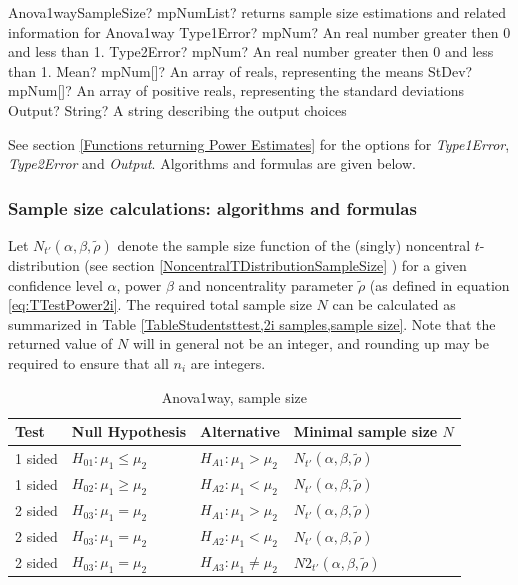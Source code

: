 \begin{mpFunctionsExtract}
	\mpFunctionFiveNotImplemented
	{Anova1waySampleSize? mpNumList? returns sample size estimations and related information for Anova1way}
	{Type1Error? mpNum? An real number greater then 0 and less than 1.}
	{Type2Error? mpNum? An real number greater then 0 and less than 1.}
	{Mean? mpNum[]? An array of reals, representing the means}
	{StDev? mpNum[]? An array of positive reals, representing the standard deviations}
	{Output? String? A string describing the output choices}
\end{mpFunctionsExtract}

\vspace{0.3cm}
See section \ref{Functions returning Power Estimates} for the options for {\itshape\sffamily Type1Error},  {\itshape\sffamily Type2Error} and {\itshape\sffamily Output}. Algorithms and formulas are given below.

\subsubsection{Sample size calculations: algorithms and formulas}
Let $N_{t'}\left(\alpha, \beta, \widetilde{\rho} \right)$ denote the sample size function of the (singly) noncentral $t$-distribution (see section \ref{NoncentralTDistributionSampleSize} ) for a given confidence level $\alpha$, power $\beta$ and noncentrality parameter $\widetilde{\rho}$ (as defined in equation \ref{eq:TTestPower2i}. The required total sample size $N$ can be calculated as summarized in Table \ref{TableStudentsttest,2i samples,sample size}. Note that the returned value of $N$ will in general not be an integer, and rounding up may be required to ensure that all $n_i$ are integers.


\begin{table}[ht]
	\centering
	\begin{tabular}{|l|l|l|l|}
		\hline
		Test &Null Hypothesis &Alternative & Minimal sample size $N$ \\
		\hline
		1 sided & $H_{01}: \mu_1 \leq \mu_2$ & $H_{A1}: \mu_1 > \mu_2$ & $N_{t'}\left(\alpha, \beta, \widetilde{\rho} \right)$ \\
		1 sided & $H_{02}: \mu_1 \geq \mu_2$ & $H_{A2}: \mu_1 < \mu_2$ & $N_{t'}\left(\alpha, \beta, \widetilde{\rho} \right)$  \\
		\hline
		2 sided & $H_{03}: \mu_1 = \mu_2$ & $H_{A1}: \mu_1 > \mu_2$ & $N_{t'}\left(\alpha, \beta, \widetilde{\rho} \right)$ \\
		2 sided & $H_{03}: \mu_1 = \mu_2$ & $H_{A2}: \mu_1 < \mu_2$ & $N_{t'}\left(\alpha, \beta, \widetilde{\rho} \right)$  \\
		2 sided & $H_{03}: \mu_1 = \mu_2$ & $H_{A3}: \mu_1 \neq \mu_2$ & $N2_{t'}\left(\alpha, \beta, \widetilde{\rho} \right)$ \\
		\hline
	\end{tabular}
	\caption{Anova1way, sample size}
	\label{TableAnova1way,sample size}
\end{table}


